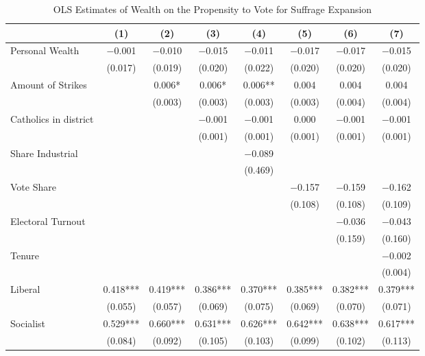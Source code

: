 \begin{table}

\caption{\label{tab:baseline_ols_suffrage}OLS Estimates of Wealth on the Propensity to Vote for Suffrage Expansion}
\centering
\begin{tabular}[t]{lccccccc}
\toprule
  & (1) & (2) & (3) & (4) & (5) & (6) & (7)\\
\midrule
Personal Wealth & \num{-0.001} & \num{-0.010} & \num{-0.015} & \num{-0.011} & \num{-0.017} & \num{-0.017} & \num{-0.015}\\
 & (\num{0.017}) & (\num{0.019}) & (\num{0.020}) & (\num{0.022}) & (\num{0.020}) & (\num{0.020}) & (\num{0.020})\\
Amount of Strikes &  & \num{0.006}* & \num{0.006}* & \num{0.006}** & \num{0.004} & \num{0.004} & \num{0.004}\\
 &  & (\num{0.003}) & (\num{0.003}) & (\num{0.003}) & (\num{0.003}) & (\num{0.004}) & (\num{0.004})\\
Catholics in district &  &  & \num{-0.001} & \num{-0.001} & \num{0.000} & \num{-0.001} & \num{-0.001}\\
 &  &  & (\num{0.001}) & (\num{0.001}) & (\num{0.001}) & (\num{0.001}) & (\num{0.001})\\
Share Industrial &  &  &  & \num{-0.089} &  &  & \\
 &  &  &  & (\num{0.469}) &  &  & \\
Vote Share &  &  &  &  & \num{-0.157} & \num{-0.159} & \num{-0.162}\\
 &  &  &  &  & (\num{0.108}) & (\num{0.108}) & (\num{0.109})\\
Electoral Turnout &  &  &  &  &  & \num{-0.036} & \num{-0.043}\\
 &  &  &  &  &  & (\num{0.159}) & (\num{0.160})\\
Tenure &  &  &  &  &  &  & \num{-0.002}\\
 &  &  &  &  &  &  & (\num{0.004})\\
Liberal & \num{0.418}*** & \num{0.419}*** & \num{0.386}*** & \num{0.370}*** & \num{0.385}*** & \num{0.382}*** & \num{0.379}***\\
 & (\num{0.055}) & (\num{0.057}) & (\num{0.069}) & (\num{0.075}) & (\num{0.069}) & (\num{0.070}) & (\num{0.071})\\
Socialist & \num{0.529}*** & \num{0.660}*** & \num{0.631}*** & \num{0.626}*** & \num{0.642}*** & \num{0.638}*** & \num{0.617}***\\
 & (\num{0.084}) & (\num{0.092}) & (\num{0.105}) & (\num{0.103}) & (\num{0.099}) & (\num{0.102}) & (\num{0.113})\\

\end{tabular}
\end{table}
